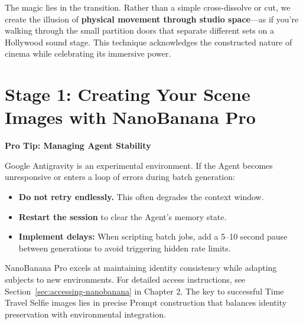 The magic lies in the transition. Rather than a simple cross-dissolve or cut, we create the illusion of \textbf{physical movement through studio space}—as if you're walking through the small partition doors that separate different sets on a Hollywood sound stage. This technique acknowledges the constructed nature of cinema while celebrating its immersive power.

\section{Stage 1: Creating Your Scene Images with NanoBanana Pro}
\label{sec:nanobanana-generation}

\begin{center}
\end{center}

\vspace{0.5em}

\begin{orangebox}
\textbf{Pro Tip: Managing Agent Stability}

\vspace{0.3em}
Google Antigravity is an experimental environment. If the Agent becomes unresponsive or enters a loop of errors during batch generation:

\begin{itemize}
    \item \textbf{Do not retry endlessly.} This often degrades the context window.
    \item \textbf{Restart the session} to clear the Agent's memory state.
    \item \textbf{Implement delays:} When scripting batch jobs, add a 5--10 second pause between generations to avoid triggering hidden rate limits.
\end{itemize}
\end{orangebox}

\vspace{0.5em}

NanoBanana Pro excels at maintaining identity consistency while adapting subjects to new environments. For detailed access instructions, see Section~\ref{sec:accessing-nanobanana} in Chapter 2. The key to successful Time Travel Selfie images lies in precise Prompt construction that balances identity preservation with environmental integration.

